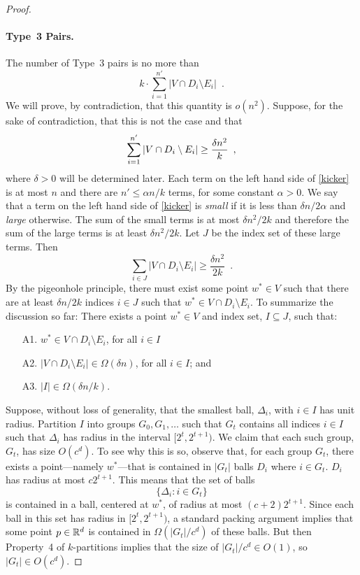 \documentclass{patmorin}
\begin{document}
\begin{proof}
  \paragraph{Type~3 Pairs.}
  The number of Type~3 pairs is no more than 
  \[  
     k\cdot\sum_{i=1}^{n'}|V\cap D_i\setminus E_i| \enspace .
  \]
  We will prove, by contradiction, that this quantity is $o(n^2)$.
  Suppose, for the sake of contradiction, that this is not the case
  and that
  \begin{equation}
    \sum_{i=1}^{n'} |V\cap D_i\setminus E_i| \ge \frac{\delta n^2}{k}
         \enspace , \eqlabel{kicker}
  \end{equation}
  where $\delta>0$ will be determined later.
  Each term on the left hand side of \eqref{kicker} is at most $n$
  and there are $n'\le \alpha n/k$ terms, for some constant $\alpha
  >0$.  We say that a term on the left hand side of \eqref{kicker} is
  \emph{small} if it is less than $\delta n/2\alpha$ and \emph{large}
  otherwise.  The sum of the small terms is at most $\delta n^2/2k$
  and therefore the sum of the large terms is at least $\delta n^2/2k$.
  Let $J$ be the index set of these large terms.  Then
  \[
    \sum_{i\in J} |V\cap D_i\setminus E_i| \ge \frac{\delta n^2}{2k} \enspace .
  \]
  By the pigeonhole principle, there must exist some point $w^*\in V$
  such that there are at least $\delta n/2k$ indices $i\in J$ such that
  $w^*\in V\cap D_i\setminus E_i$.  To summarize the discussion so far:
  There exists a point $w^*\in V$ and index set, $I\subseteq J$,
  such that:
  \begin{enumerate}
     \item[A1.] $w^*\in V\cap D_{i}\setminus E_{i}$, for all
        $i\in I$
     \item[A2.] $|V\cap D_{i}\setminus E_{i}|\in \Omega(\delta n)$,
       for all $i\in I$; and
     \item[A3.] $|I|\in\Omega(\delta n/k)$.
  \end{enumerate}

  Suppose, without loss of generality, that the smallest ball,
  $\Delta_i$, with $i\in I$ has unit radius.  Partition $I$ into groups
  $G_0,G_1,\ldots$ such that $G_t$ contains all indices $i\in I$ such
  that $\Delta_{i}$ has radius in the interval $[2^t,2^{t+1})$.  We claim
  that each such group, $G_t$, has size $O(c^d)$.  To see why this is
  so, observe that, for each group $G_t$, there exists a point---namely
  $w^*$---that is contained in $|G_t|$ balls $D_{i}$ where $i\in G_t$.
  $D_{i}$ has radius at most $c2^{t+1}$.  This means that the set of balls
  \[
     \{ \Delta_i : i\in G_t\}
  \]
  is contained in a ball, centered at $w^*$, of radius at most
  $(c+2)2^{t+1}$.  Since each ball in this set has radius in
  $[2^t,2^{t+1})$, a standard packing argument implies that some point
  $p\in\mathbb{R}^d$ is contained in $\Omega(|G_t|/c^d)$ of these balls. But then
  Property~4 of $k$-partitions implies that the size of $|G_t|/c^d\in
  O(1)$, so $|G_t|\in O(c^d)$.


\end{proof}
\end{document}
